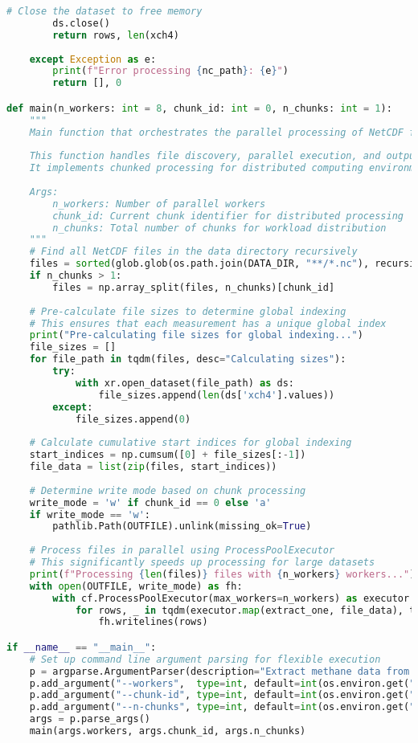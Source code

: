 \begin{lstlisting}[language=Python, caption=Parallel NetCDF Data Extraction Algorithm, label=alg:step01_extract]
        # Close the dataset to free memory
        ds.close()
        return rows, len(xch4)
        
    except Exception as e:
        print(f"Error processing {nc_path}: {e}")
        return [], 0

def main(n_workers: int = 8, chunk_id: int = 0, n_chunks: int = 1):
    """
    Main function that orchestrates the parallel processing of NetCDF files.
    
    This function handles file discovery, parallel execution, and output management.
    It implements chunked processing for distributed computing environments.
    
    Args:
        n_workers: Number of parallel workers
        chunk_id: Current chunk identifier for distributed processing
        n_chunks: Total number of chunks for workload distribution
    """
    # Find all NetCDF files in the data directory recursively
    files = sorted(glob.glob(os.path.join(DATA_DIR, "**/*.nc"), recursive=True))
    if n_chunks > 1:
        files = np.array_split(files, n_chunks)[chunk_id]
    
    # Pre-calculate file sizes to determine global indexing
    # This ensures that each measurement has a unique global index
    print("Pre-calculating file sizes for global indexing...")
    file_sizes = []
    for file_path in tqdm(files, desc="Calculating sizes"):
        try:
            with xr.open_dataset(file_path) as ds:
                file_sizes.append(len(ds['xch4'].values))
        except:
            file_sizes.append(0)
    
    # Calculate cumulative start indices for global indexing
    start_indices = np.cumsum([0] + file_sizes[:-1])
    file_data = list(zip(files, start_indices))
    
    # Determine write mode based on chunk processing
    write_mode = 'w' if chunk_id == 0 else 'a'
    if write_mode == 'w':
        pathlib.Path(OUTFILE).unlink(missing_ok=True)
    
    # Process files in parallel using ProcessPoolExecutor
    # This significantly speeds up processing for large datasets
    print(f"Processing {len(files)} files with {n_workers} workers...")
    with open(OUTFILE, write_mode) as fh:
        with cf.ProcessPoolExecutor(max_workers=n_workers) as executor:
            for rows, _ in tqdm(executor.map(extract_one, file_data), total=len(files)):
                fh.writelines(rows)

if __name__ == "__main__":
    # Set up command line argument parsing for flexible execution
    p = argparse.ArgumentParser(description="Extract methane data from NetCDF files")
    p.add_argument("--workers",  type=int, default=int(os.environ.get("SLURM_CPUS_ON_NODE", 200)))
    p.add_argument("--chunk-id", type=int, default=int(os.environ.get("SLURM_ARRAY_TASK_ID", 0)))
    p.add_argument("--n-chunks", type=int, default=int(os.environ.get("SLURM_ARRAY_TASK_COUNT", 1)))
    args = p.parse_args()
    main(args.workers, args.chunk_id, args.n_chunks)
\end{lstlisting}

